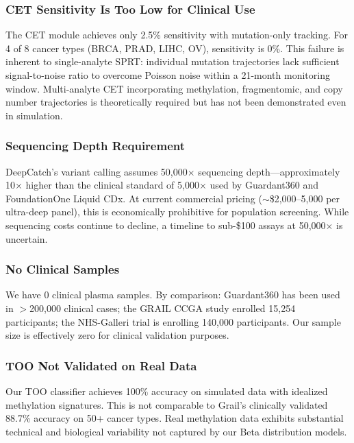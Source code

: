 \documentclass[10pt,a4paper]{article}
\begin{document}
\subsubsection{CET Sensitivity Is Too Low for Clinical Use}

The CET module achieves only 2.5\% sensitivity with mutation-only tracking. For 4 of 8 cancer types (BRCA, PRAD, LIHC, OV), sensitivity is 0\%. This failure is inherent to single-analyte SPRT: individual mutation trajectories lack sufficient signal-to-noise ratio to overcome Poisson noise within a 21-month monitoring window. Multi-analyte CET incorporating methylation, fragmentomic, and copy number trajectories is theoretically required but has not been demonstrated even in simulation.

\subsubsection{Sequencing Depth Requirement}

DeepCatch's variant calling assumes 50,000$\times$ sequencing depth—approximately 10$\times$ higher than the clinical standard of 5,000$\times$ used by Guardant360 and FoundationOne Liquid CDx. At current commercial pricing ($\sim$\$2,000--5,000 per ultra-deep panel), this is economically prohibitive for population screening. While sequencing costs continue to decline, a timeline to sub-\$100 assays at 50,000$\times$ is uncertain.

\subsubsection{No Clinical Samples}

We have 0 clinical plasma samples. By comparison: Guardant360 has been used in $>$200,000 clinical cases; the GRAIL CCGA study enrolled 15,254 participants; the NHS-Galleri trial is enrolling 140,000 participants. Our sample size is effectively zero for clinical validation purposes.

\subsubsection{TOO Not Validated on Real Data}

Our TOO classifier achieves 100\% accuracy on simulated data with idealized methylation signatures. This is not comparable to Grail's clinically validated 88.7\% accuracy on 50+ cancer types. Real methylation data exhibits substantial technical and biological variability not captured by our Beta distribution models.
\end{document}
